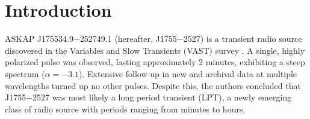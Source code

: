 \documentclass[preprint2,linenumbers]{aastex631}
\newcommand{\src}{J1755$-$2527}
\newcommand{\srcfull}{ASKAP J175534.9$-$252749.1}
\begin{document}
\begin{abstract}

  [Abstract goes here\dots]

\end{abstract}



\section{Introduction} \label{sec:introduction}

\srcfull{} (hereafter, \src{}) is a transient radio source discovered in the Variables and Slow Transients (VAST) survey \citep[][hereafter ]{2024MNRAS.535..909D}.
A single, highly polarized pulse was observed, lasting approximately 2 minutes, exhibiting a steep spectrum ($\alpha = -3.1$).
Extensive follow up in new and archival data at multiple wavelengths turned up no other pulses.
Despite this, the authors concluded that \src{} was most likely a long period transient (LPT), a newly emerging class of radio source with periods ranging from minutes to hours.
\end{document}
